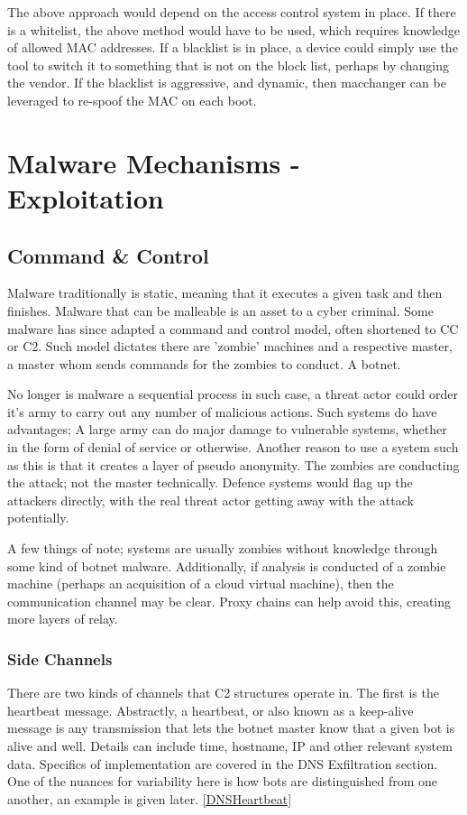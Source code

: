 The above approach would depend on the access control system in place. If there is a whitelist, the above method would have to be used, which requires knowledge of allowed MAC addresses. If a blacklist is in place, a device could simply use the tool to switch it to something that is not on the block list, perhaps by changing the vendor. If the blacklist is aggressive, and dynamic, then macchanger can be leveraged to re-spoof the MAC on each boot.


\chapter{Malware Mechanisms - Exploitation}

\section{Command \& Control}
Malware traditionally is static, meaning that it executes a given task and then finishes. Malware that can be malleable is an asset to a cyber criminal. 
Some malware has since adapted a command and control model, often shortened to CC or C2. Such model dictates there are 'zombie' machines and a respective master, a master whom sends commands for the zombies to conduct. A botnet.

No longer is malware a sequential process in such case, a threat actor could order it's army to carry out any number of malicious actions. Such systems do have advantages; A large army can do major damage to vulnerable systems, whether in the form of denial of service or otherwise.
Another reason to use a system such as this is that it creates a layer of pseudo anonymity. The zombies are conducting the attack; not the master technically. Defence systems would flag up the attackers directly, with the real threat actor getting away with the attack potentially.

A few things of note; systems are usually zombies without knowledge through some kind of botnet malware. Additionally, if analysis is conducted of a zombie machine (perhaps an acquisition of a cloud virtual machine), then the communication channel may be clear. Proxy chains can help avoid this, creating more layers of relay.

\subsection{Side Channels}\label{C2Channels}
There are two kinds of channels that C2 structures operate in. The first is the heartbeat message. Abstractly, a heartbeat, or also known as a keep-alive message is any transmission that lets the botnet master know that a given bot is alive and well. Details can include time, hostname, IP and other relevant system data. \cite{DNSTunneling}
Specifics of implementation are covered in the DNS Exfiltration section. One of the nuances for variability here is how bots are distinguished from one another, an example is given later. \ref{DNSHeartbeat}

